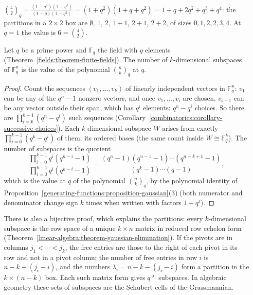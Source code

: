 \begin{example}\label{generating-functions:example-gaussian}
$\binom{4}{2}_q = \frac{(1 - q^4)(1 - q^3)}{(1 - q)(1 - q^2)} = (1 + q^2)(1 + q + q^2) = 1 + q + 2q^2 + q^3 + q^4$: the partitions in a $2 \times 2$ box are $\emptyset$, $1$, $2$, $1 + 1$, $2 + 1$,
$2 + 2$, of sizes $0, 1, 2, 2, 3, 4$. At $q = 1$ the value is $6 = \binom{4}{2}$.
\end{example}

\begin{theorem}\label{generating-functions:theorem-subspaces}
Let $q$ be a prime power and $\mathbb{F}_q$ the field with $q$ elements (Theorem~\ref{fields:theorem-finite-fields}). The number of $k$-dimensional subspaces of $\mathbb{F}_q^n$ is the value of
the polynomial $\binom{n}{k}_q$ at $q$.
\end{theorem}

\begin{proof}
Count the sequences $(v_1, \ldots, v_k)$ of linearly independent vectors in $\mathbb{F}_q^n$: $v_1$ can be any of the $q^n - 1$ nonzero vectors, and once $v_1, \ldots, v_{i}$ are chosen, $v_{i+1}$
can be any vector outside their span, which has $q^i$ elements: $q^n - q^i$ choices. So there are $\prod_{i=0}^{k-1}(q^n - q^i)$ such sequences (Corollary~\ref{combinatorics:corollary-successive-choices}).
Each $k$-dimensional subspace $W$ arises from exactly $\prod_{i=0}^{k-1}(q^k - q^i)$ of them, its ordered bases (the same count inside $W \cong \mathbb{F}_q^k$). The number of subspaces is the
quotient
\[
\frac{\prod_{i=0}^{k-1}q^i(q^{n-i} - 1)}{\prod_{i=0}^{k-1}q^i(q^{k-i} - 1)} = \frac{(q^n - 1)(q^{n-1} - 1) \cdots (q^{n-k+1} - 1)}{(q^k - 1) \cdots (q - 1)},
\]
which is the value at $q$ of the polynomial $\binom{n}{k}_q$, by the polynomial identity of Proposition~\ref{generating-functions:proposition-gaussian}(3) (both numerator and denominator change sign
$k$ times when written with factors $1 - q^j$).
\end{proof}

\begin{remark}\label{generating-functions:remark-schubert}
There is also a bijective proof, which explains the partitions: every $k$-dimensional subspace is the row space of a unique $k \times n$ matrix in reduced row echelon form
(Theorem~\ref{linear-algebra:theorem-gaussian-elimination}). If the pivots are in columns $j_1 < \cdots < j_k$, the free entries are those to the right of each pivot in its row and not in a pivot
column; the number of free entries in row $i$ is $n - k - (j_i - i)$, and the numbers $\lambda_i = n - k - (j_i - i)$ form a partition in the $k \times (n - k)$ box. Each such matrix form gives
$q^{|\lambda|}$ subspaces. In algebraic geometry these sets of subspaces are the Schubert cells of the Grassmannian.
\end{remark}

